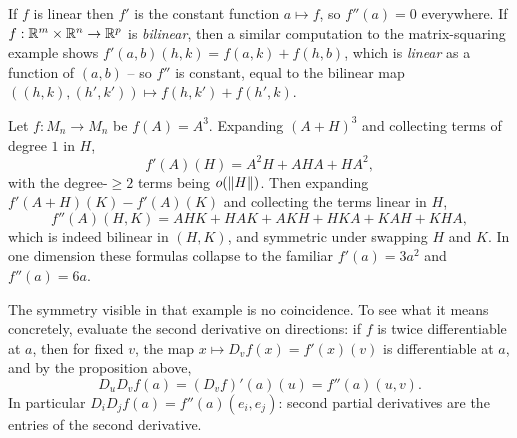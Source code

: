 \documentclass[a4paper]{scrartcl}
\begin{document}
\begin{example}
    If $f$ is linear then $f'$ is the constant function $a \mapsto f$, so $f''(a) = 0$ everywhere. If $f: \mathbb{R}^m \times \mathbb{R}^n \rightarrow \mathbb{R}^p$ is \emph{bilinear}, then a similar computation to the matrix-squaring example shows $f'(a, b)(h, k) = f(a, k) + f(h, b)$, which is \emph{linear} as a function of $(a, b)$ -- so $f''$ is constant, equal to the bilinear map $((h,k),(h',k')) \mapsto f(h, k') + f(h', k)$.
\end{example}

\begin{example}
    Let $f: M_n \rightarrow M_n$ be $f(A) = A^3$. Expanding $(A + H)^3$ and collecting terms of degree $1$ in $H$,
    $$
    f'(A)(H) = A^2H + AHA + HA^2,
    $$
    with the degree-$\geq 2$ terms being $o(\norm{H})$. Then expanding $f'(A + H)(K) - f'(A)(K)$ and collecting the terms linear in $H$,
    $$
    f''(A)(H, K) = AHK + HAK + AKH + HKA + KAH + KHA,
    $$
    which is indeed bilinear in $(H, K)$, and symmetric under swapping $H$ and $K$. In one dimension these formulas collapse to the familiar $f'(a) = 3a^2$ and $f''(a) = 6a$.
\end{example}

The symmetry visible in that example is no coincidence. To see what it means concretely, evaluate the second derivative on directions: if $f$ is twice differentiable at $a$, then for fixed $v$, the map $x \mapsto D_v f(x) = f'(x)(v)$ is differentiable at $a$, and by the proposition above,
$$
D_u D_v f(a) = (D_vf)'(a)(u) = f''(a)(u, v).
$$
In particular $D_iD_jf(a) = f''(a)(e_i, e_j)$: second partial derivatives are the entries of the second derivative.
\end{document}
